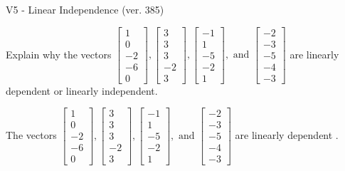 \begin{exercise}
  \begin{exerciseTitle}V5 - Linear Independence (ver. 385)\end{exerciseTitle}
  \begin{exerciseStatement}
    Explain why the vectors \(\left[\begin{array}{r}
1 \\
0 \\
-2 \\
-6 \\
0
\end{array}\right] , \left[\begin{array}{r}
3 \\
3 \\
3 \\
-2 \\
3
\end{array}\right] , \left[\begin{array}{r}
-1 \\
1 \\
-5 \\
-2 \\
1
\end{array}\right] , \text{ and } \left[\begin{array}{r}
-2 \\
-3 \\
-5 \\
-4 \\
-3
\end{array}\right]\) are linearly dependent or linearly independent.	


  \end{exerciseStatement}
  \begin{exerciseAnswer}
   The vectors \(\left[\begin{array}{r}
1 \\
0 \\
-2 \\
-6 \\
0
\end{array}\right] , \left[\begin{array}{r}
3 \\
3 \\
3 \\
-2 \\
3
\end{array}\right] , \left[\begin{array}{r}
-1 \\
1 \\
-5 \\
-2 \\
1
\end{array}\right] , \text{ and } \left[\begin{array}{r}
-2 \\
-3 \\
-5 \\
-4 \\
-3
\end{array}\right]\) are 
  	 linearly dependent  .
  


  \end{exerciseAnswer}
\end{exercise}